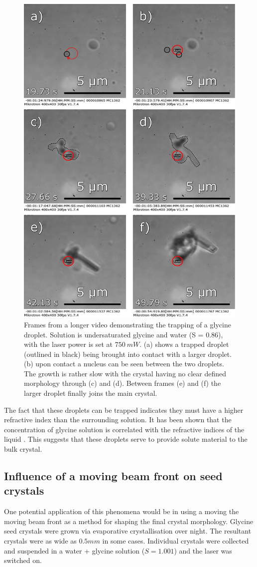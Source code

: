 \begin{figure}[h!]
	\centering
	\includegraphics[width=0.7\linewidth]{cluster_trapping.pdf}
	\caption{Frames from a longer video demonstrating the trapping of a glycine 
		droplet. Solution is undersaturated glycine and water (S = 0.86), with the 
		laser power is set at $750\ mW$. (a) shows a trapped droplet (outlined in 
		black) being brought into contact with a larger droplet. (b) upon contact 
		a nucleus can be seen between the two droplets. The growth is rather slow 
		with the crystal having no clear defined morphology through (c) and (d). 
		Between frames (e) and (f) the larger droplet finally joins the main crystal.}
	\label{fig:cluster_trapping}
\end{figure}

The fact that these droplets can be trapped indicates they must have a higher 
refractive index than the surrounding solution. It has been shown that the 
concentration of glycine solution is correlated with the refractive indices 
of the liquid \cite{Gowayed2021, Orttung1963}. This suggests that these droplets 
serve to provide solute material to the bulk crystal. 


\subsection{Influence of a moving beam front on seed crystals}
One potential application of this phenomena would be in using a 
moving the moving beam front as a method for shaping the final
crystal morphology. Glycine seed crystals were grown via 
evaporative crystallisation over night. The resultant crystals
were as wide as $0.5 mm$ in some cases. Individual crystals were 
collected and suspended in a water + glycine solution ($S = 1.001$)
and the laser was switched on.  

